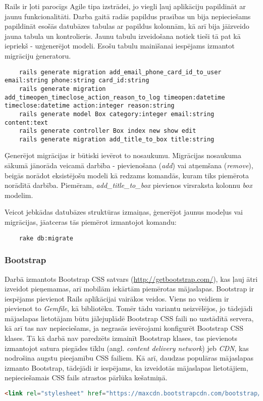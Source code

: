 Rails ir ļoti parocīgs Agile tipa izstrādei, jo viegli ļauj aplikāciju papildināt ar jaunu funkcionalitāti. Darba gaitā radās papildus prasības un bija nepieciešams papildināt esošās datubāzes tabulas ar papildus kolonnām, kā arī bija jāizveido jauna tabula un kontrolieris. Jaunu tabulu izveidošana notiek tieši tā pat kā iepriekš - uzģenerējot modeli. Esošu tabulu mainīšanai iespējams izmantot migrāciju ģeneratoru.
\begin{lstlisting}
	rails generate migration add_email_phone_card_id_to_user email:string phone:string card_id:string
	rails generate migration add_timeopen_timeclose_action_reason_to_log timeopen:datetime timeclose:datetime action:integer reason:string
	rails generate model Box category:integer email:string content:text
	rails generate controller Box index new show edit
	rails generate migration add_title_to_box title:string
\end{lstlisting}
Ģenerējot migrācijas ir būtiski ievērot to nosaukumu. Migrācijas nosaukuma sākumā jānorāda veicamā darbība - pievienošana (\textit{add}) vai atņemšana (\textit{remove}), beigās norādot eksistējošu modeli kā redzams komandās, kuram tiks piemērota norādītā darbība. Piemēram, \textit{add_title_to_box} pievienos virsraksta kolonnu \textit{box} modelim.


Veicot jebkādas datubāzes struktūras izmaiņas, ģenerējot jaunus modeļus vai migrācijas, jāatceras tās piemērot izmantojot komandu:
\begin{lstlisting}
	rake db:migrate
\end{lstlisting}

\subsubsection{Bootstrap}
Darbā izmantots Bootstrap CSS satvars (\url{http://getbootstrap.com/}), kas ļauj ātri izveidot pieņemamas, arī mobilām iekārtām piemērotas mājaslapas.
Bootstrap ir iespējams pievienot Rails aplikācijai vairākos veidos. Viens no veidiem ir pievienot to \textit{Gemfile}, kā bibliotēku. Tomēr tādu variantu neizvēlējos, jo tādejādi mājaslapas lietotājam būtu jālejuplādē Bootstrap CSS faili no uzstādītā servera, kā arī tas nav nepieciešams, ja negrasās ievērojami konfigurēt Bootstrap CSS klases.
Tā kā darbā nav paredzēts izmainīt Bootstrap klases, tas pievienots izmantojot satura piegādes tīklu (angl. \textit{content delivery network}) jeb \textit{CDN}, kas nodrošina augstu pieejamību CSS failiem. Kā arī, daudzas populāras mājaslapas izmanto Bootstrap, tādejādi ir iespējams, ka izveidotās mājaslapas lietotājiem, nepieciešamais CSS fails atrastos pārlūka kešatmiņā.
\begin{lstlisting}[language=HTML]
<link rel="stylesheet" href="https://maxcdn.bootstrapcdn.com/bootstrap/3.3.6/css/bootstrap.min.css" integrity="sha384-1q8mTJOASx8j1Au+a5WDVnPi2lkFfwwEAa8hDDdjZlpLegxhjVME1fgjWPGmkzs7" crossorigin="anonymous">
\end{lstlisting}

